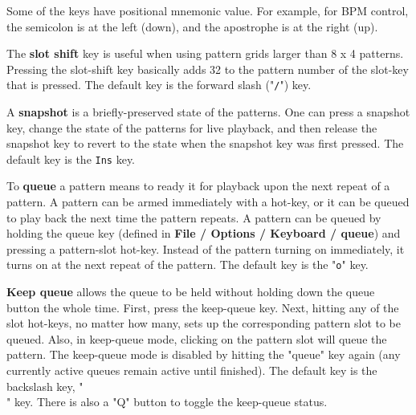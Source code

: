    Some of the keys have positional mnemonic value.  For example,
   for BPM control, the semicolon is at the left (down), and the apostrophe
   is at the right (up).

   The \textbf{slot shift} key is useful when using pattern grids larger
   than 8 x 4 patterns.  Pressing the slot-shift key basically adds 32 to the
   pattern number of the slot-key that is pressed.
   The default key is the forward slash ("\texttt{/}") key.

   A \textbf{snapshot} is a briefly-preserved state of the patterns.
   One can press a snapshot key, change the state of the patterns for live
   playback, and then release the snapshot key to revert to the state when
   the snapshot key was first pressed.
   The default key is the \texttt{Ins} key.

%
%

   To \textbf{queue}
   a pattern means to ready it for playback upon the next repeat
   of a pattern.  A pattern can be armed immediately with a hot-key,
   or it can be queued to play back the next time the pattern repeats.
   A pattern can be queued by holding the queue key (defined in
   \textbf{File / Options / Keyboard / queue}) and pressing a pattern-slot
   hot-key.  Instead of the pattern turning on
   immediately, it turns on at the next repeat of the pattern.
   The default key is the "\texttt{o}" key.

   \textbf{Keep queue}
   allows the queue to be held without holding
   down the queue button the whole time.  First, press the keep-queue key.
   Next, hitting
   any of the slot hot-keys, no matter how many, sets up the corresponding
   pattern slot to be queued.  Also, in keep-queue mode, clicking on the
   pattern slot will queue the pattern.  The keep-queue mode is disabled by
   hitting the "queue" key again (any currently active queues remain active
   until finished).
   The default key is the backslash key, "\texttt{\\}" key.
   There is also a "Q" button to toggle the keep-queue
   status.

